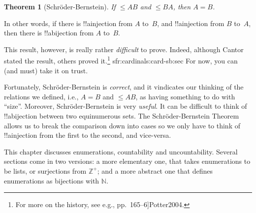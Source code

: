 \documentclass[10pt,a4paper]{article}
\makeatletter
\theoremstyle{plain}
\newtheorem{thm}{Theorem}[section]
\theoremstyle{definition}
\theoremstyle{remark}
\newenvironment{explain}{}{}
\newenvironment{editorial}{}{}
\newcommand*{\olchapter}[3]{}
\newcommand*{\olimport}[1]{}
\newcommand*{\ollabel}[1]{\label{#1}}
\newcommand{\olref}{\@ifnextchar[{\olref@i}{\olref@final}}
\def\olref@i[#1]{\@ifnextchar[{\olref@ii}{\olref@final}}
\def\olref@ii[#1]{\@ifnextchar[{\olref@iii}{\olref@final}}
\def\olref@iii[#1]{\olref@final}
\def\olref@final#1{\ref{#1}}
\providecommand{\Nat}{\ensuremath{\mathbb{N}}}
\providecommand{\cardle}{\leq}
\providecommand{\PosInt}{\mathbb{Z}^{+}}
\providecommand{\oliflabeldef}[3]{#1}
\providecommand{\citet}[1]{\cite{#1}}
\providecommand{\cardeq}[2]{#1 = #2}
\providecommand{\cardle}{\leq}
\providecommand{\oliflabeldef}[2]{#1}
\makeatother
\begin{document}
\begin{thm}[Schr\"oder-Bernstein]
	\ollabel{thm:schroder-bernstein}
	If $\cardle{A}{B}$ and $\cardle{B}{A}$,
	then $\cardeq{A}{B}$.
\end{thm}

\begin{explain}
In other words, if there is !!a{injection} from $A$ to~$B$, and
!!a{injection} from $B$ to~$A$, then there is !!a{bijection} from $A$
to~$B$. 

This result, however, is really rather \emph{difficult} to prove.
Indeed, although Cantor stated the result, others proved
it.\footnote{For more on the history, see e.g.,
\citet[pp.~165--6]{Potter2004}.}
\oliflabeldef{sfr:cardinals:card-sb:sec}{We will only be in
a position to \emph{prove} Schr\"oder-Bernstein in
\olref[sfr][cardinals][card-sb]{sec}.}{}%
For now, you can (and must)
take it on trust. 

Fortunately, Schr\"oder-Bernstein is \emph{correct}, and it
vindicates our thinking of the relations we defined, i.e.,
$\cardeq{A}{B}$ and $\cardle{A}{B}$, as having something to do with
``size''. Moreover, Schr\"oder-Bernstein is very \emph{useful}. It
can be difficult to think of !!a{bijection} between two equinumerous
sets. The Schr\"oder-Bernstein Theorem allows us to break the comparison
down into cases so we only have to think of !!a{injection} from the
first to the second, and vice-versa.
\end{explain}



\olchapter{sfr}{siz}{The Size of Sets}

\begin{editorial}
This chapter discusses enumerations, countability and uncountability.
Several sections come in two versions: a more elementary one, that
takes enumerations to be lists, or surjections from $\PosInt$; and a
more abstract one that defines enumerations as bijections with $\Nat$.
\end{editorial}

\olimport{introduction}

\olimport{enumerability}

\olimport{zig-zag}

\olimport{pairing}

\olimport{pairing-alt}

\olimport{non-enumerability}
\end{document}
